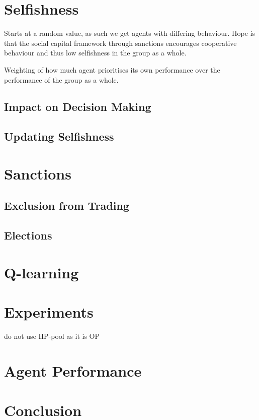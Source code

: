 \section{Selfishness}

Starts at a random value, as such we get agents with differing behaviour. Hope is that the social capital framework through sanctions encourages cooperative behaviour and thus low selfishness in the group as a whole.

Weighting of how much agent prioritises its own performance over the performance of the group as a whole.

\subsection{Impact on Decision Making}

\subsection{Updating Selfishness}


\section{Sanctions}

\subsection{Exclusion from Trading}

\subsection{Elections}

\section{Q-learning}

\section{Experiments}
do not use HP-pool as it is OP

\section{Agent Performance}

\section{Conclusion}